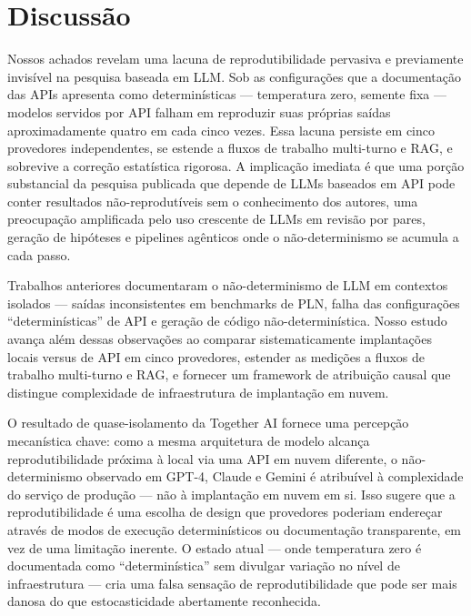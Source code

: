 \documentclass[12pt,a4paper]{article}
\begin{document}
\section*{Discussão}

Nossos achados revelam uma lacuna de reprodutibilidade pervasiva e previamente invisível na pesquisa baseada em LLM.
Sob as configurações que a documentação das APIs apresenta como determinísticas --- temperatura zero, semente fixa --- modelos servidos por API falham em reproduzir suas próprias saídas aproximadamente quatro em cada cinco vezes.
Essa lacuna persiste em cinco provedores independentes, se estende a fluxos de trabalho multi-turno e RAG, e sobrevive a correção estatística rigorosa.
A implicação imediata é que uma porção substancial da pesquisa publicada que depende de LLMs baseados em API pode conter resultados não-reprodutíveis sem o conhecimento dos autores, uma preocupação amplificada pelo uso crescente de LLMs em revisão por pares, geração de hipóteses e pipelines agênticos onde o não-determinismo se acumula a cada passo.

Trabalhos anteriores documentaram o não-determinismo de LLM em contextos isolados --- saídas inconsistentes em benchmarks de PLN, falha das configurações ``determinísticas'' de API e geração de código não-determinística.
Nosso estudo avança além dessas observações ao comparar sistematicamente implantações locais versus de API em cinco provedores, estender as medições a fluxos de trabalho multi-turno e RAG, e fornecer um framework de atribuição causal que distingue complexidade de infraestrutura de implantação em nuvem.

O resultado de quase-isolamento da Together AI fornece uma percepção mecanística chave: como a mesma arquitetura de modelo alcança reprodutibilidade próxima à local via uma API em nuvem diferente, o não-determinismo observado em GPT-4, Claude e Gemini é atribuível à complexidade do serviço de produção --- não à implantação em nuvem em si.
Isso sugere que a reprodutibilidade é uma escolha de design que provedores poderiam endereçar através de modos de execução determinísticos ou documentação transparente, em vez de uma limitação inerente.
O estado atual --- onde temperatura zero é documentada como ``determinística'' sem divulgar variação no nível de infraestrutura --- cria uma falsa sensação de reprodutibilidade que pode ser mais danosa do que estocasticidade abertamente reconhecida.
\end{document}

